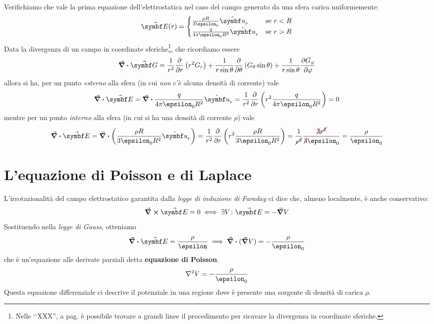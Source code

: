 \begin{examplewt}
	Verifichiamo che vale la prima equazione dell'elettrostatica nel caso del campo generato da una sfera carica uniformemente:
	\begin{equation*}
		\vba{E}(r)=\begin{cases}
			\frac{\rho R}{3\epsilon_0}\vbh{u}_r&\text{se}\ r< R\\
			\frac{q}{4\pi\epsilon_0 R^2}\vbh{u}_r &\text{se}\ r> R
		\end{cases}
	\end{equation*}
	Data la divergenza di un campo in coordinate sferiche\footnote{Nelle ‘‘XXX'', a pag. \pageref{DivergenzaSferiche} è possibile trovare a grandi linee il procedimento per ricavare la divergenza in coordinate sferiche.}, che ricordiamo essere
	\begin{equation*}
		\div{\vba{G}}=\frac{1}{r^2}\pdv{r}\left(r^2G_r\right)+\frac{1}{r\sin\theta}\pdv{\theta}\left(G_\theta\sin\theta\right)+\frac{1}{r\sin\theta}\pdv{G_\phi}{\phi}
	\end{equation*}
	allora si ha, per un punto \textit{esterno} alla sfera (in cui \textit{non} c'è alcuna densità di corrente) vale
	\begin{equation}
		\divergence{\vba{E}}=\div{\frac{q}{4\pi\epsilon_0 R^2}\vbh{u}_r}=\frac{1}{r^2}\pdv{r}\left(r^2\frac{q}{4\pi\epsilon_0 R^2}\right)=0
	\end{equation}
	mentre per un punto \textit{interno} alla sfera (in cui si ha una densità di corrente $\rho$) vale
	\begin{equation*}
		\div{\vba{E}}=\div{\left(\frac{\rho R}{3\epsilon_0R^2}\vbh{u}_r\right)}=\frac{1}{r^2}\pdv{r}\left(r^2\frac{\rho R}{3\epsilon_0R^2}\right)=\frac{1}{\Ccancel[red]{r^2}}\frac{\Ccancel[red]{3}\Ccancel[red]{r^2}}{\Ccancel[red]{3}\epsilon_0}=\frac{\rho}{\epsilon_0}
	\end{equation*}
\end{examplewt}
\section{L'equazione di Poisson e di Laplace}\label{EqPoissonSezione}
L'irrotazionalità del campo elettrostatico garantita dalla \textit{legge di induzione di Faraday} ci dice che, almeno localmente, è anche conservativo:
\begin{equation*}
	\curl{\vba{E}}=0\iff \exists V\colon \vba{E}=-\grad{V}
\end{equation*}
Sostituendo nella \textit{legge di Gauss}, otteniamo
\begin{equation*}
	\div{\vba{E}}=\frac{\rho}{\epsilon}\implies\div{(\grad{V})}=-\frac{\rho}{\epsilon_0}
\end{equation*}
che è un'equazione alle derivate parziali detta \textbf{equazione di Poisson}.
\begin{equation}
	\laplacian{V}=-\frac{\rho}{\epsilon_0}
\end{equation}
Questa equazione differenziale ci descrive il potenziale in una regione dove è presente una sorgente di densità di carica $\rho$.

